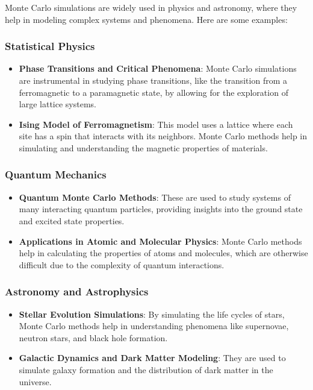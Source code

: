 Monte Carlo simulations are widely used in physics and astronomy, where
they help in modeling complex systems and phenomena. Here are some
examples:

\subsubsection{Statistical Physics}\label{statistical-physics}

\begin{itemize}
\tightlist
\item
  \textbf{Phase Transitions and Critical Phenomena}: Monte Carlo
  simulations are instrumental in studying phase transitions, like the
  transition from a ferromagnetic to a paramagnetic state, by allowing
  for the exploration of large lattice systems.
\item
  \textbf{Ising Model of Ferromagnetism}: This model uses a lattice
  where each site has a spin that interacts with its neighbors. Monte
  Carlo methods help in simulating and understanding the magnetic
  properties of materials.
\end{itemize}

\subsubsection{Quantum Mechanics}\label{quantum-mechanics}

\begin{itemize}
\tightlist
\item
  \textbf{Quantum Monte Carlo Methods}: These are used to study systems
  of many interacting quantum particles, providing insights into the
  ground state and excited state properties.
\item
  \textbf{Applications in Atomic and Molecular Physics}: Monte Carlo
  methods help in calculating the properties of atoms and molecules,
  which are otherwise difficult due to the complexity of quantum
  interactions.
\end{itemize}

\subsubsection{Astronomy and
Astrophysics}\label{astronomy-and-astrophysics}

\begin{itemize}
\tightlist
\item
  \textbf{Stellar Evolution Simulations}: By simulating the life cycles
  of stars, Monte Carlo methods help in understanding phenomena like
  supernovae, neutron stars, and black hole formation.
\item
  \textbf{Galactic Dynamics and Dark Matter Modeling}: They are used to
  simulate galaxy formation and the distribution of dark matter in the
  universe.
\end{itemize}

